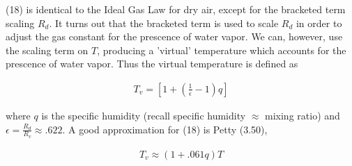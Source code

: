 \documentclass[a4paper,12pt]{article}
\begin{document}
(18) is identical to the Ideal Gas Law for dry air, except for the bracketed term scaling $R_d$. It turns out that the bracketed term is used to scale $R_d$ in order to adjust the gas constant for the prescence of water vapor. We can, however, use the scaling term on $T$, producing a 'virtual' temperature which accounts for the prescence of water vapor. Thus the virtual temperature is defined as

\begin{align}
\boxed{T_v = \left[1 + (\frac{1}{\epsilon} - 1)q\right]}
\end{align}

where $q$ is the specific humidity (recall specific humidity $\approx$ mixing ratio) and $\epsilon = \frac{R_d}{R_v} \approx .622$. A good approximation for (18) is Petty (3.50),

\begin{align}
T_v \approx (1 + .061q)T
\end{align}
 
\end{document}
